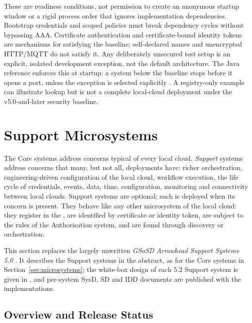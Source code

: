 \documentclass[a4paper]{arrowhead}
\newcommand{\sys}[1]{\textcolor{ArrowheadBlue}{\textbf{\ahbreak{#1}}}}      %
\begin{document}
These are readiness conditions, not permission to create an anonymous startup
window or a rigid process order that ignores implementation dependencies.
Bootstrap credentials and scoped policies must break dependency cycles without
bypassing AAA. Certificate authentication and certificate-bound identity tokens are
mechanisms for satisfying the baseline; self-declared names and unencrypted
HTTP/MQTT do not satisfy it. Any deliberately unsecured test setup is an explicit,
isolated development exception, not the default architecture. The Java reference
enforces this at startup: a system below the baseline stops before it opens a port,
unless the exception is selected explicitly \cite{javaConformance20261107}. A registry-only
example can illustrate lookup but is not a complete local-cloud deployment under
the v5.0-and-later security baseline.



\newpage
\section{Support Microsystems}
\label{sec:support}

The Core systems address concerns typical of every local cloud. \emph{Support} systems address
concerns that many, but not all, deployments have: richer orchestration, engineering-driven
configuration of the local cloud, workflow execution, the life cycle of credentials, events, data,
time, configuration, monitoring and connectivity between local clouds. Support systems are
optional; each is deployed when its concern is present. They behave like any other microsystem
of the local cloud: they register in the \sys{ServiceRegistry}, are identified by certificate or
identity token, are subject to the rules of the Authorisation system, and are found through
discovery or orchestration.

This section replaces the largely unwritten \emph{GSoSD Arrowhead Support Systems 5.0}
\cite{gsosdsup50}. It describes the Support systems in the abstract, as for the Core systems in
Section~\ref{sec:microsystems}; the white-box design of each 5.2 Support system is given in
\cite{gsosddsup}, and per-system SysD, SD and IDD documents are published with the
implementations.

\subsection{Overview and Release Status}
\label{sec:sup:overview}
\end{document}
